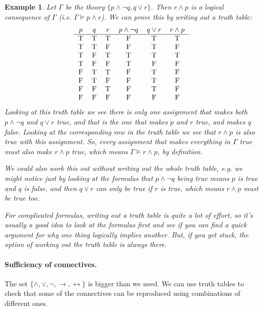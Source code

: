 \documentclass{article}
\theoremstyle{plain}
\newtheorem{example}[theorem]{Example}{\bfseries}{\upshape}
\begin{document}
\begin{example}
Let $\Gamma$ be the theory $\{p\wedge \neg q, q\vee r\}$. Then $r\wedge p$ is a logical consequence of $\Gamma$ (i.e. $\Gamma\models p\wedge r$). We can prove this by writing out a truth table:
\[\begin{tabular}{ c c c c c c c}
 $p$ & $q$ & $r$ & $p\wedge \neg q$ & $q\vee r$ & $r\wedge p$ \\ \hline 
 T & T & T & F & T & T \\  
 T & T & F & F & T & F \\
 T & F & T & T & T & T \\
 T & F & F & T & F & F \\
 F & T & T & F & T & F \\
 F & T & F & F & T & F \\
 F & F & T & F & T & F \\
 F & F & F & F & F & F
\end{tabular}\]
Looking at this truth table we see there is only one assignment that makes both $p\wedge \neg q$ and $q\vee r$ true, and that is the one that makes $p$ and $r$ true, and makes $q$ false. Looking at the corresponding row in the truth table we see that $r\wedge p$ is also true with this assignment. So, every assignment that makes everything in $\Gamma$ true must also make $r\wedge p$ true, which means $\Gamma\models r\wedge p$, by definition.

We could also work this out without writing out the whole truth table, e.g. we might notice just by looking at the formulas that $p\wedge \neg q$ being true means $p$ is true and $q$ is false, and then $q\vee r$ can only be true if $r$ is true, which means $r\wedge p$ must be true too.

For complicated formulas, writing out a truth table is quite a lot of effort, so it's usually a good idea to look at the formulas first and see if you can find a quick argument for why one thing logically implies another. But, if you get stuck, the option of working out the truth table is always there.
\end{example}

\paragraph{Sufficiency of connectives.} The set $\{\wedge,\vee,\neg,\rightarrow,\leftrightarrow\}$ is bigger than we need. We can use truth tables to check that some of the connectives can be reproduced using combinations of different ones.
\end{document}
